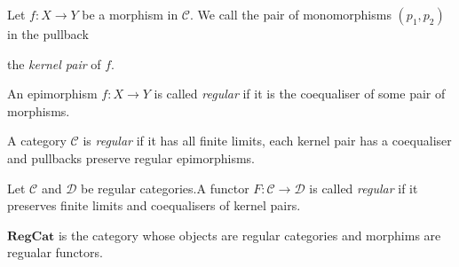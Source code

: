 \documentclass[14pt]{beamer}
\theoremstyle{plain}
\begin{document}
  \begin{frame}[fragile]
    \begin{definition}
      Let $f : X \to Y$ be a morphism in $\mathcal{C}$. We call the pair of monomorphisms
      $(p_1, p_2)$ in the pullback
      \begin{center}
      \end{center}
      the \emph{kernel pair} of $f$.
    \end{definition}
  \end{frame}

  \begin{frame}[fragile]
    \begin{definition}
      An epimorphism $f : X \to Y$ is called \emph{regular} if it is the coequaliser
      of some pair of morphisms.
      \begin{center}
      \end{center}
    \end{definition}
    \pause
    \begin{definition}
      A category $\mathcal{C}$ is \emph{regular} if it has all finite limits,
      each kernel pair has a coequaliser and pullbacks preserve regular epimorphisms.
    \end{definition}
  \end{frame}

  \begin{frame}
    \begin{definition}
      Let $\mathcal{C}$ and $\mathcal{D}$ be regular categories.A functor
      $F : \mathcal{C} \to \mathcal{D}$ is called \emph{regular} if it preserves finite
      limits and coequalisers of kernel pairs.
    \end{definition}
    \pause
    \begin{definition}
      $\mathbf{RegCat}$ is the category whose objects are regular categories and
      morphims are regualar functors.
    \end{definition}
  \end{frame}
\end{document}
